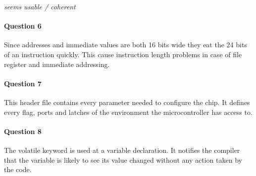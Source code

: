 \documentclass[10pt]{article}
\begin{document}
\emph{seems usable / coherent}


\paragraph{Question 6}

Since addresses and immediate values are both 16 bits wide they eat the 24 bits of an instruction quickly.
This cause instruction length problems in case of file register and immediate addressing.


\paragraph{Question 7}

This header file contains every parameter needed to configure the chip. It defines every flag, ports and latches of the environment the microcontroller has access to.


\paragraph{Question 8}

The volatile keyword is used at a variable declaration. It notifies the compiler that the variable is likely to see its value changed without any action taken by the code.
\end{document}

